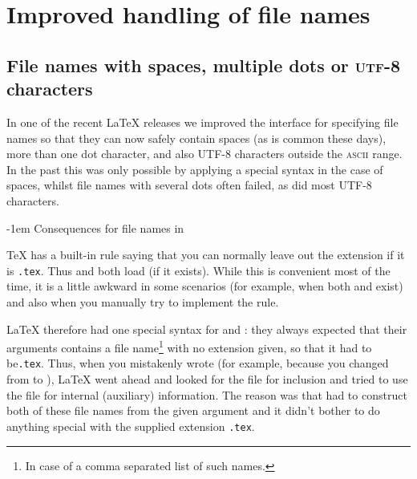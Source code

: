 \documentclass{ltnews}
\makeatletter
\providecommand\acro[1]{\textsc{#1}}
\renewcommand{\subsubsection}{%
   \@startsection      {subsubsection}{2}{0pt}{1.5ex \@plus 1ex \@minus .2ex}%
      {-1em}{\@subheadingfont\colonize}%
}
\newcommand\colonize[1]{#1:}
\makeatother
\begin{document}
\section{Improved handling of file names}



\subsection[File names with spaces, multiple dots or\\
            \acro{utf-8} characters]
           {File names with spaces, multiple dots or \acro{utf-8} characters}

In one of the recent \LaTeX{} releases we improved the interface
for specifying file names so that they can now safely contain spaces
(as is common these days),
more than one dot character, and also UTF-8 characters
outside the \acro{ascii} range. 
In the past this was only possible by applying a special syntax
in the case of spaces, 
whilst file names with several dots often failed, 
as did most UTF-8 characters.


\subsubsection{Consequences for file names in }

\TeX{} has a built-in rule saying that you can normally leave out the
extension if it is \texttt{.tex}.  Thus \verb== and
\verb== both load  (if it exists).
While this is convenient most of the time, it is a little awkward in
some scenarios (for example, when both  and 
exist) and also when you manually try to implement the rule.

\LaTeX{} therefore had one special syntax for  and
: they always expected that 
their arguments contains a
file name\footnote{In case of  a comma separated list of such names.} 
with no extension given,
  so that it had to be\texttt{.tex}.  Thus,
 when you mistakenly wrote
\verb== (for example,
because you changed from 
to ),
\LaTeX{} went ahead and looked for the
file  for inclusion and tried to
use the file  for internal (auxiliary) information.  The reason was that
 had to construct both
of these file names from the given
argument and it didn't bother to do
anything special
with the supplied 
extension \texttt{.tex}.
\end{document}
